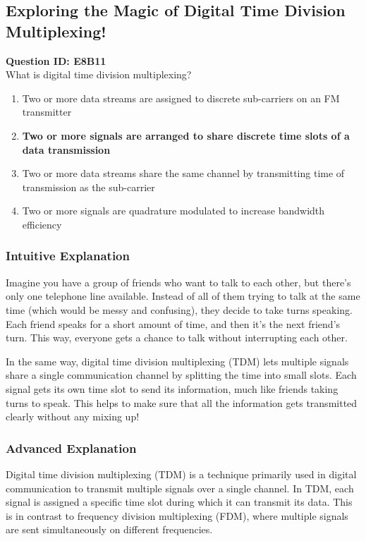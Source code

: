\subsection{Exploring the Magic of Digital Time Division Multiplexing!}

\begin{tcolorbox}
\textbf{Question ID: E8B11} \\
What is digital time division multiplexing? \\
\begin{enumerate}[label=\Alph*.]
    \item Two or more data streams are assigned to discrete sub-carriers on an FM transmitter
    \item \textbf{Two or more signals are arranged to share discrete time slots of a data transmission}
    \item Two or more data streams share the same channel by transmitting time of transmission as the sub-carrier
    \item Two or more signals are quadrature modulated to increase bandwidth efficiency
\end{enumerate}
\end{tcolorbox}

\subsubsection{Intuitive Explanation}
Imagine you have a group of friends who want to talk to each other, but there's only one telephone line available. Instead of all of them trying to talk at the same time (which would be messy and confusing), they decide to take turns speaking. Each friend speaks for a short amount of time, and then it's the next friend's turn. This way, everyone gets a chance to talk without interrupting each other.

In the same way, digital time division multiplexing (TDM) lets multiple signals share a single communication channel by splitting the time into small slots. Each signal gets its own time slot to send its information, much like friends taking turns to speak. This helps to make sure that all the information gets transmitted clearly without any mixing up!

\subsubsection{Advanced Explanation}
Digital time division multiplexing (TDM) is a technique primarily used in digital communication to transmit multiple signals over a single channel. In TDM, each signal is assigned a specific time slot during which it can transmit its data. This is in contrast to frequency division multiplexing (FDM), where multiple signals are sent simultaneously on different frequencies.

